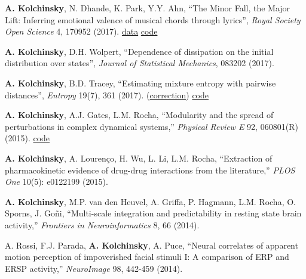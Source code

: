 \textbf{A. Kolchinsky}, N. Dhande, K. Park, Y.Y. Ahn, ``The Minor Fall, the Major Lift: Inferring emotional valence of musical chords through lyrics'', \emph{Royal Society Open Science} 4, 170952 (2017).  \href{https://doi.org/10.6084/m9.figshare.5413060.v1.}{data} \href{https://github.com/artemyk/chordsentiment}{code} 

\textbf{A. Kolchinsky}\CA, D.H. Wolpert, ``Dependence of dissipation on the initial distribution over states'', \emph{Journal of Statistical Mechanics}, 083202 (2017).   

\textbf{A. Kolchinsky}, B.D. Tracey, ``Estimating mixture entropy with pairwise distances'', \emph{Entropy} 19(7), 361 (2017). (\href{https://www.mdpi.com/1099-4300/19/11/588}{correction})  \href{https://github.com/btracey/mixent/}{code} 

\textbf{A. Kolchinsky}\CA, A.J. Gates, L.M. Rocha, ``Modularity and the spread of perturbations in complex dynamical systems,'' \emph{Physical Review E} 92, 060801(R) (2015).  \href{https://github.com/artemyk/perturbationmodularity/}{code} 

\textbf{A. Kolchinsky}, A. Lourenço, H. Wu, L. Li, L.M. Rocha, ``Extraction of pharmacokinetic evidence of drug-drug interactions from the literature,'' \emph{PLOS One} 10(5): e0122199 (2015).  

\textbf{A. Kolchinsky}, M.P. van den Heuvel, A. Griffa, P. Hagmann, L.M. Rocha, O. Sporns, J. Goñi, ``Multi-scale integration and predictability in resting state brain activity,'' \emph{Frontiers in Neuroinformatics} 8, 66 (2014).  

A. Rossi, F.J. Parada, \textbf{A. Kolchinsky}, A. Puce, ``Neural correlates of apparent motion perception of impoverished facial stimuli I: A comparison of ERP and ERSP activity,'' \emph{NeuroImage} 98, 442-459 (2014).  

